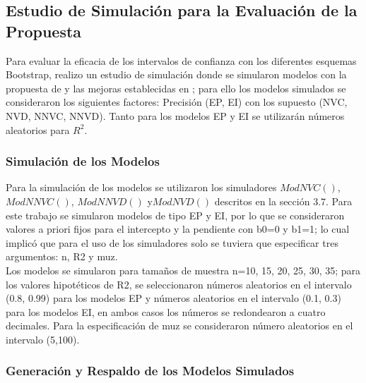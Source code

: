 	 
\subsection{Estudio de Simulación para la Evaluación de la Propuesta}

Para evaluar la eficacia de los intervalos de confianza con los diferentes esquemas Bootstrap, realizo un estudio de simulación donde se simularon modelos con la propuesta de \textcite{febles-2014} y las mejoras establecidas en \textcite{zacarias-2023}; para ello los modelos simulados se consideraron los siguientes factores: Precisión (EP, EI) con los supuesto (NVC, NVD, NNVC, NNVD). Tanto para los modelos EP y EI se utilizarán números aleatorios para $R^{2}$.


\subsubsection{Simulación de los Modelos}
Para la simulación de los modelos se utilizaron los simuladores $ModNVC()$, $ModNNVC()$, $ModNNVD()$ y$ ModNVD()$ descritos en la sección 3.7. Para este trabajo se simularon modelos de tipo EP y EI, por lo que se consideraron valores a priori fijos para el intercepto y la pendiente con b0=0 y b1=1; lo cual implicó que para el uso de los simuladores solo se tuviera que especificar tres argumentos: n, R2 y muz.\\

Los modelos se simularon para tamaños de muestra n=10, 15, 20, 25, 30, 35; para los valores hipotéticos de R2, se seleccionaron números aleatorios en el intervalo (0.8, 0.99) para los modelos EP y números aleatorios en el intervalo (0.1, 0.3) para los modelos EI, en ambos casos los números se redondearon a cuatro decimales. Para la especificación de muz se consideraron número aleatorios en el intervalo (5,100).\\
 

\subsubsection{Generación y Respaldo de los Modelos Simulados}

